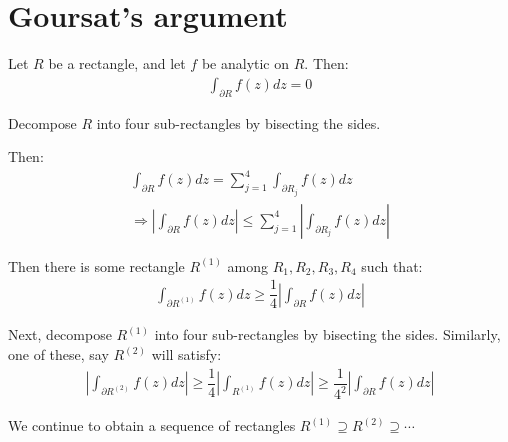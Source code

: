 \section{Goursat's argument}
\par\bigskip
\begin{theo}[Goursat]{}
  Let $R$ be a rectangle, and let $f$ be analytic on $R$. Then:
  \begin{equation*}
    \begin{gathered}
      \int_{\partial R}f(z)dz = 0
    \end{gathered}
  \end{equation*}
\end{theo}
\par\bigskip
\begin{prf}[]{}
  Decompose $R$ into four sub-rectangles by bisecting the sides.
  \par\bigskip
  \noindent Then:
  \begin{equation*}
    \begin{gathered}
      \int_{\partial R}f(z)dz = \sum_{j=1}^{4}\int_{\partial R_j}f(z)dz\\
      \Rightarrow \left|\int_{\partial R}f(z)dz\right|\leq\sum_{j=1}^{4}\left|\int_{\partial R_j}f(z)dz\right|
    \end{gathered}
  \end{equation*}
  \par\bigskip
  \noindent Then there is some rectangle $R^{(1)}$ among $R_1,R_2,R_3,R_4$ such that:
  \begin{equation*}
    \begin{gathered}
      \int_{\partial R^{(1)}}f(z)dz \geq\dfrac{1}{4}\left|\int_{\partial R}f(z)dz\right|
    \end{gathered}
  \end{equation*}
  \par\bigskip
  \noindent Next, decompose $R^{(1)}$ into four sub-rectangles by bisecting the sides. Similarly, one of these, say $R^{(2)}$ will satisfy:
  \begin{equation*}
    \begin{gathered}
      \left|\int_{\partial R^{(2)}}f(z)dz\right|\geq\dfrac{1}{4}\left|\int_{R^{(1)}}f(z)dz\right|\geq\dfrac{1}{4^2}\left|\int_{\partial R}f(z)dz\right|
    \end{gathered}
  \end{equation*}
  \par\bigskip
  \noindent We continue to obtain a sequence of rectangles $R^{(1)}\supseteq R^{(2)}\supseteq\cdots$

\end{prf}
